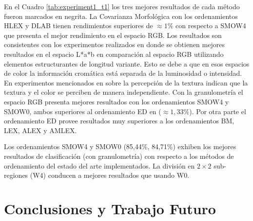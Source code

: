 En el Cuadro \ref{tab:experiment1_t1} los tres mejores resultados de cada método fueron marcados en negrita. La Covarianza Morfológica con los ordenamientos HLEX y DLAB tienen rendimientos superiores de $\approx 1\%$ con respecto a SMOW4 que presenta el mejor rendimiento en el espacio RGB. Los resultados son consistentes con los experimentos realizados en \cite{hanbury2005illumination} donde se obtienen mejores resultados en el espacio L*a*b en comparación al espacio RGB utilizando elementos estructurantes de longitud variante. Esto se debe a que en esos espacios de color la información cromática está separada de la luminosidad o intensidad. En experimentos mencionados en \cite{bianconi2011theoretical} sobre la percepción de la textura indican que la textura y el color se perciben de manera independiente. 
Con la granulometría el espacio RGB presenta mejores resultados con los ordenamientos SMOW4 y SMOW0, ambos superiores al ordenamiento ED en ($\approx 1,33 \% $). Por otra parte el ordenamiento ED provee resultados muy superiores a los ordenamientos BM, LEX, ALEX y AMLEX.

Los ordenamientos SMOW4 y SMOW0 (85,44\%, 84,71\%) exhiben los mejores resultados de clasificación (con granulometría) con respecto a los métodos de ordenamiento del estado del arte implementados. La división en $2\times2$ sub-regiones (W4) conducen a mejores resultados que usando W0.  

\section{Conclusiones y Trabajo Futuro}

